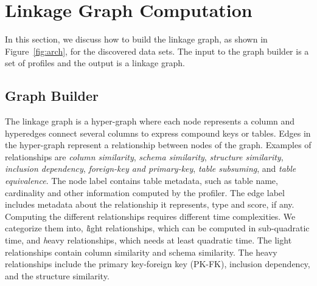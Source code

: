 \section{Linkage Graph Computation}
\label{sec:stitching}
In this section, we discuss how to build the linkage graph, as shown in
Figure~\ref{fig:arch}, for the discovered data sets. The input to the graph
builder is a set of profiles and the output is a linkage graph.

\subsection{Graph Builder}
\label{subsec:graphbuild}

The linkage graph is a hyper-graph
where each node represents a column and hyperedges connect
several columns to express compound keys or tables. 
Edges in the hyper-graph
represent a relationship between nodes of the graph. Examples of relationships are 
\emph{column similarity}, 
\emph{schema similarity}, 
\emph{structure similarity}, %
\emph{inclusion dependency}, 
\emph{foreign-key and primary-key}, 
\emph{table subsuming}, and 
\emph{table equivalence}. 
The node label contains table metadata, such as table name, cardinality and
other information computed by the profiler. The edge label includes metadata
about the relationship it represents, \eg type and score, if any. Computing
the different relationships requires different time complexities. We 
categorize them into, {\textit light relationships}, which can be computed in
sub-quadratic time, and {\textit heavy relationships}, which needs at least
quadratic time. The light relationships contain column similarity and schema
similarity. The heavy relationships include the primary key-foreign key
(PK-FK), inclusion dependency, and the structure similarity. 


